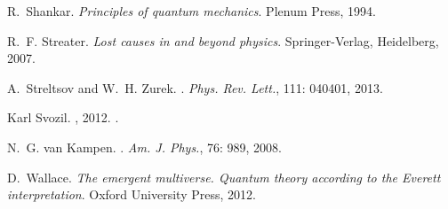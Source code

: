\documentclass[12pt]{article}
\begin{document}
\begin{thebibliography}{63}
R.~Shankar.
\newblock \emph{{Principles of quantum mechanics}}.
\newblock Plenum Press, 1994.

R.~F. Streater.
\newblock \emph{{Lost causes in and beyond physics}}.
\newblock Springer-Verlag, Heidelberg, 2007.

A.~Streltsov and W.~H. Zurek.
.
\newblock \emph{Phys. Rev. Lett.}, 111: 040401, 2013.

Karl Svozil.
, 2012.
.

N.~G. van Kampen.
.
\newblock \emph{Am. J. Phys.}, 76: 989, 2008.

D.~Wallace.
\newblock \emph{{The emergent multiverse. Quantum theory according to the
  Everett interpretation}}.
\newblock Oxford University Press, 2012.

\end{thebibliography}
\end{document}

